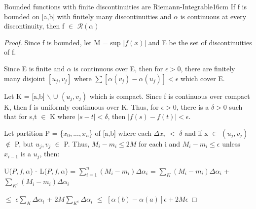     \vspace{0.5cm}



    \begin{wtheorem}{Bounded functions with finite discontinuities
    are Riemann-Integrable}{16cm}
        If f is bounded on [a,b] with finitely many discontinuities
        and $\alpha$ is continuous at every discontinuity, then
        f $\in$ $\mathscr{R}(\alpha)$        
    \end{wtheorem}

    \begin{proof}
        Since f is bounded, let M = sup $|f(x)|$ and
        E be the set of discontinuities of f.

        Since E is finite and $\alpha$ is continuous over E, then
        for $\epsilon > 0$, there are finitely many disjoint
        $[u_j,v_j]$ where $\sum [\alpha(v_j) - \alpha(u_j)] < \epsilon$ which cover E.

        Let K = [a,b] $\backslash$ $\cup$ $(u_j,v_j)$ which is compact.
        Since f is continuous over compact K, then f is uniformly continuous
        over K.
        Thus, for $\epsilon > 0$, there is a $\delta > 0$ such that for
        s,t $\in$ K where $|s-t| < \delta$, then $|f(s) - f(t)| < \epsilon$.

        Let partition P = \{$x_0,...,x_n$\} of [a,b] where
        each $\Delta x_i$ $<$ $\delta$ and if x $\in$ 
        $(u_j,v_j)$ $\not \in$ P, but $u_j,v_j$ $\in$ P.
        Thus, $M_i - m_i \leq 2M$ for each i and
        $M_i - m_i \leq \epsilon$ unless
        $x_{i-1}$ is a $u_j$, then:

        \hspace{0.1cm}
        U($P,f,\alpha$) - L($P,f,\alpha$)
        = $\sum_{i=1}^n (M_i - m_i) \Delta \alpha_i$
        = $\sum_{K} (M_i - m_i) \Delta \alpha_i$
            + $\sum_{K^c} (M_i - m_i) \Delta \alpha_i$

        \hspace{3.9cm}
        $\leq$ $\epsilon \sum_{K} \Delta \alpha_i$
            + $2M \sum_{K^c} \Delta \alpha_i$
        $\leq$ $[\alpha(b) - \alpha(a)]\epsilon + 2M\epsilon$
    \end{proof}



